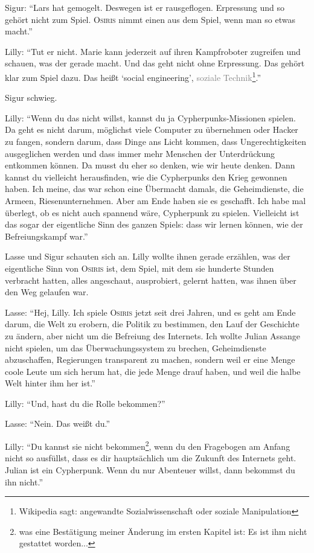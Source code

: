 Sigur: \enquote{Lars hat gemogelt.
Deswegen ist er rausgeflogen.
Erpressung und so gehört nicht zum Spiel.
\textsc{Osiris} nimmt einen aus dem Spiel, wenn man so etwas macht.}

Lilly: \enquote{Tut er nicht.
Marie kann jederzeit auf ihren Kampfroboter zugreifen und schauen, was der gerade macht.
Und das geht nicht ohne Erpressung.
Das gehört klar zum Spiel dazu.
Das heißt \enquote{social engineering}, \textcolor{gray}{soziale Technik}\footnote{Wikipedia sagt: angewandte Sozialwissenschaft oder soziale Manipulation}.}

Sigur schwieg.

Lilly: \enquote{Wenn du das nicht willst, kannst du ja Cypherpunks-Missionen spielen.
Da geht es nicht darum, möglichst viele Computer zu übernehmen oder Hacker zu fangen, sondern darum, dass Dinge ans Licht kommen, dass Ungerechtigkeiten ausgeglichen werden und dass immer mehr Menschen der Unterdrückung entkommen können.
Da musst du eher so denken, wie wir heute denken.
Dann kannst du vielleicht herausfinden, wie die Cypherpunks den Krieg gewonnen haben.
Ich meine, das war schon eine Übermacht damals, die Geheimdienste, die Armeen, Riesenunternehmen.
Aber am Ende haben sie es geschafft.
Ich habe mal überlegt, ob es nicht auch spannend wäre, Cypherpunk zu spielen.
Vielleicht ist das sogar der eigentliche Sinn des ganzen Spiels: dass wir lernen können, wie der Befreiungskampf war.}

Lasse und Sigur schauten sich an.
Lilly wollte ihnen gerade erzählen, was der eigentliche Sinn von \textsc{Osiris} ist, dem Spiel, mit dem sie hunderte Stunden verbracht hatten, alles angeschaut, ausprobiert, gelernt hatten, was ihnen über den Weg gelaufen war.

Lasse: \enquote{Hej, Lilly.
Ich spiele \textsc{Osiris} jetzt seit drei Jahren, und es geht am Ende darum, die Welt zu erobern, die Politik zu bestimmen, den Lauf der Geschichte zu ändern, aber nicht um die Befreiung des Internets.
Ich wollte Julian Assange nicht spielen, um das Überwachungssystem  zu brechen, Geheimdienste abzuschaffen, Regierungen transparent zu machen, sondern weil er eine Menge coole Leute um sich herum hat, die jede Menge drauf haben, und weil die halbe Welt hinter ihm her ist.}

Lilly: \enquote{Und, hast du die Rolle bekommen?}

Lasse: \enquote{Nein.
Das weißt du.}

Lilly: \enquote{Du kannst sie nicht bekommen\footnote{was eine Bestätigung meiner Änderung im ersten Kapitel ist: Es ist ihm nicht gestattet worden...}, wenn du den Fragebogen am Anfang nicht so ausfüllst, dass es dir hauptsächlich um die Zukunft des Internets geht.
Julian ist ein Cypherpunk.
Wenn du nur Abenteuer willst, dann bekommst du ihn nicht.}

